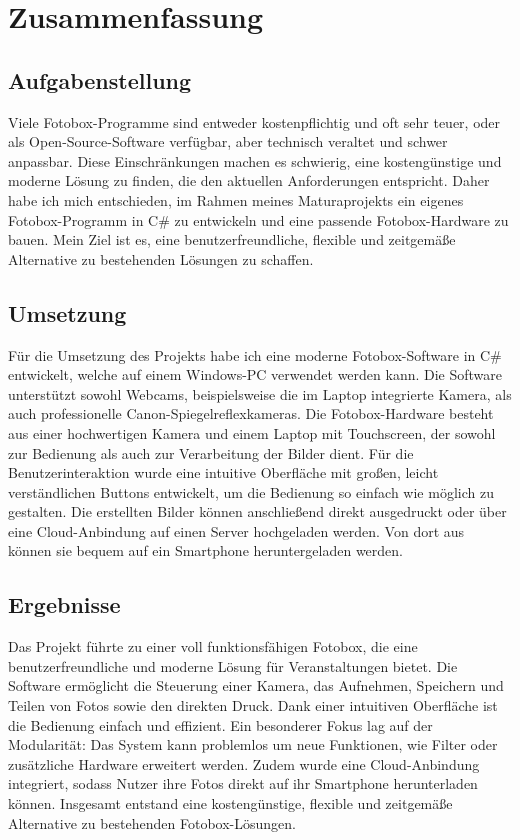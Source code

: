\documentclass[12pt, a4paper]{article}
\begin{document}
\section{Zusammenfassung}

\subsection{Aufgabenstellung}

Viele Fotobox-Programme sind entweder kostenpflichtig und oft sehr teuer, oder 
als Open-Source-Software verfügbar, aber technisch veraltet und schwer anpassbar.
Diese Einschränkungen machen es schwierig, eine kostengünstige und moderne
Lösung zu finden, die den aktuellen Anforderungen entspricht.
Daher habe ich mich entschieden, im Rahmen meines Maturaprojekts ein eigenes
Fotobox-Programm in C\# zu entwickeln und eine passende Fotobox-Hardware zu bauen.
Mein Ziel ist es, eine benutzerfreundliche, flexible und zeitgemäße Alternative
zu bestehenden Lösungen zu schaffen.

\subsection{Umsetzung}

Für die Umsetzung des Projekts habe ich eine moderne Fotobox-Software in C\# entwickelt,
welche auf einem Windows-PC verwendet werden kann. Die Software unterstützt sowohl Webcams,
beispielsweise die im Laptop integrierte Kamera, als auch professionelle Canon-Spiegelreflexkameras.
Die Fotobox-Hardware besteht aus einer hochwertigen Kamera und einem Laptop mit Touchscreen,
der sowohl zur Bedienung als auch zur Verarbeitung der Bilder dient. 
Für die Benutzerinteraktion wurde eine intuitive Oberfläche mit großen,
leicht verständlichen Buttons entwickelt, um die Bedienung so einfach wie
möglich zu gestalten. Die erstellten Bilder können anschließend direkt
ausgedruckt oder über eine Cloud-Anbindung auf einen Server hochgeladen werden.
Von dort aus können sie bequem auf ein Smartphone heruntergeladen werden.

\subsection{Ergebnisse}

Das Projekt führte zu einer voll funktionsfähigen Fotobox, die eine
benutzerfreundliche und moderne Lösung für Veranstaltungen bietet.
Die Software ermöglicht die Steuerung einer Kamera, das Aufnehmen,
Speichern und Teilen von Fotos sowie den direkten Druck. Dank einer intuitiven
Oberfläche ist die Bedienung einfach und effizient.
Ein besonderer Fokus lag auf der Modularität: Das System kann problemlos
um neue Funktionen, wie Filter oder zusätzliche Hardware erweitert werden.
Zudem wurde eine Cloud-Anbindung integriert, sodass Nutzer ihre Fotos direkt
auf ihr Smartphone herunterladen können. Insgesamt entstand eine kostengünstige,
flexible und zeitgemäße Alternative zu bestehenden Fotobox-Lösungen.




\end{document}
